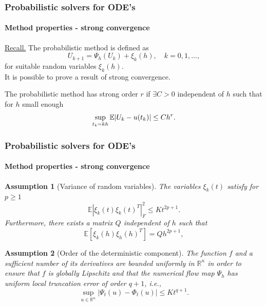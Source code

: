 \documentclass{beamer}
\newcommand{\R}{\mathbb{R}}
\newcommand{\E}{\mathbb{E}}
\newtheorem{assumption}{Assumption}
\begin{document}
\begin{frame}
	\frametitle{Probabilistic solvers for ODE's}
	\framesubtitle{Method properties - strong convergence \cite{CGS16}}
	
	\underline{Recall.} The probabilistic method is defined as
	\begin{equation*}
		U_{k+1} = \Psi_h(U_k) + \xi_k(h), \quad k = 0, 1, \ldots,
	\end{equation*}
	for suitable random variables $\xi_k(h)$. \\[0.5cm]
	
	It is possible to prove a result of strong convergence.
	
	\begin{definition} The probabilistic method has strong order $r$ if $\exists C > 0$ independent of $h$ such that for $h$ small enough
		\begin{equation*}
			\sup_{t_k = kh} \E\abs{U_k - u(t_k)} \leq Ch^r.
		\end{equation*}
	\end{definition}
	
\end{frame}
	
\begin{frame}
	\frametitle{Probabilistic solvers for ODE's}
	\framesubtitle{Method properties - strong convergence \cite{CGS16}}
	
	\begin{assumption}[Variance of random variables] The variables $\xi_k(t)$ satisfy for $p \geq 1$
		\begin{equation*}
			\E|\xi_k(t)\xi_k(t)^T|^2_F \leq Kt^{2p+1}.
		\end{equation*}
		Furthermore, there exists a matrix $Q$ independent of $h$ such that 
		\begin{equation*}
		\E[\xi_k(h)\xi_h(h)^T] = Qh^{2p+1},
		\end{equation*}
	\end{assumption}
		
	\begin{assumption}[Order of the deterministic component] The function $f$ and a sufficient number of its derivatives are bounded uniformly in $\R^n$ in order to ensure that $f$ is globally Lipschitz and that the numerical flow map $\Psi_h$ has uniform local truncation error of order $q + 1$, i.e., 
		\begin{equation*}
			\sup_{u\in\R^n} |\Psi_t(u) - \Phi_t(u)| \leq Kt^{q+1}.
		\end{equation*}
	\end{assumption}	
\end{frame}
\end{document}
